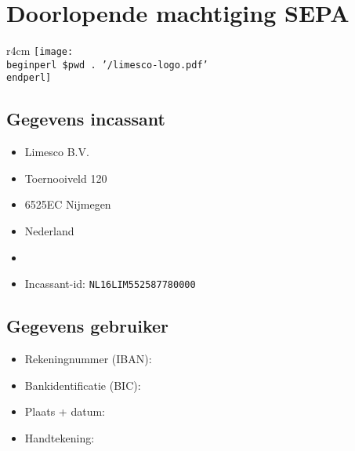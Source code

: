 \documentclass[a4paper,11pt]{memoir}
\begin{document}
\pagestyle{machtiging}

\section*{Doorlopende machtiging SEPA}

\begin{wrapfigure}[0]{r}{4cm}
\vspace{-0.5\linewidth}
\texttt{[image: \\beginperl \$pwd . '/limesco-logo.pdf' \\endperl]}
\vfill
\end{wrapfigure}

\subsection*{Gegevens incassant}
\begin{itemize}[leftmargin=0pt,label={},itemsep=-4pt]
\item Limesco B.V.
\item Toernooiveld 120
\item 6525EC Nijmegen
\item Nederland
\item{}
\item Incassant-id: \texttt{NL16LIM552587780000}
\end{itemize}

\subsection*{Gegevens gebruiker}

\begin{itemize}[label={},leftmargin=0pt]
\item Rekeningnummer (IBAN): \dotfill
\item Bankidentificatie (BIC): \dotfill
\item Plaats + datum: \dotfill
\item Handtekening:
\end{itemize}
\end{document}
